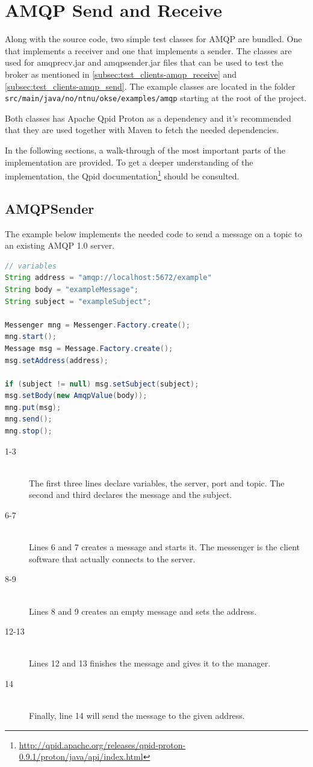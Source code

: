 \section{AMQP Send and Receive}
Along with the source code, two simple test classes for AMQP are bundled. One that implements a receiver and one that implements a sender. The classes are used for amqprecv.jar and amqpsender.jar files that can be used to test the broker as mentioned in \ref{subsec:test_clients-amqp_receive} and \ref{subsec:test_clients-amqp_send}. The example classes are located in the folder \verb!src/main/java/no/ntnu/okse/examples/amqp! starting at the root of the project.

Both classes has Apache Qpid Proton as a dependency and it's recommended that they are used together with Maven to fetch the needed dependencies.

In the following sections, a walk-through of the most important parts of the implementation are provided. To get a deeper understanding of the implementation, the Qpid documentation\footnote{\url{http://qpid.apache.org/releases/qpid-proton-0.9.1/proton/java/api/index.html}} should be consulted.

\subsection{AMQPSender}
The example below implements the needed code to send a message on a topic to an existing AMQP 1.0 server.

\begin{lstlisting}[language=Java, captionpos=b, caption=Example use of Messenger to subscribe, frame=bt, showstringspaces=false,label={lst:AMQPSender}]
// variables
String address = "amqp://localhost:5672/example"
String body = "exampleMessage";
String subject = "exampleSubject";

Messenger mng = Messenger.Factory.create();
mng.start();
Message msg = Message.Factory.create();
msg.setAddress(address);

if (subject != null) msg.setSubject(subject);
msg.setBody(new AmqpValue(body));
mng.put(msg);
mng.send();
mng.stop();
\end{lstlisting}

\begin{description}
\item[1-3] \hfill \\ The first three lines declare variables, the server, port and topic. The second and third declares the message and the subject.
\item[6-7] \hfill \\ Lines 6 and 7 creates a message and starts it. The messenger is the client software that actually connects to the server.
\item[8-9] \hfill \\ Lines 8 and 9 creates an empty message and sets the address.
\item[12-13] \hfill \\ Lines 12 and 13 finishes the message and gives it to the manager.
\item[14] \hfill \\ Finally, line 14 will send the message to the given address.
\end{description}

